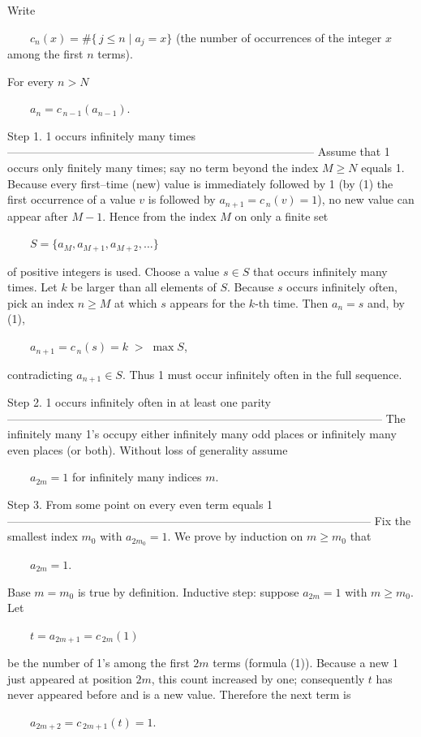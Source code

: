 Write  

  \(\displaystyle c_n(x)=\#\{\,j\le n\mid a_j=x\}\)       (the number of occurrences of the integer \(x\) among the first \(n\) terms).

For every \(n>N\)

  \(\displaystyle a_n=c_{\,n-1}(a_{n-1}).\tag{1}\)

Step 1.  1 occurs infinitely many times  
———————————————————————————  
Assume that 1 occurs only finitely many times; say no term beyond the index \(M\ge N\) equals 1.  
Because every first–time (new) value is immediately followed by 1 (by (1) the
first occurrence of a value \(v\) is followed by \(a_{n+1}=c_{\,n}(v)=1\)),
no new value can appear after \(M-1\).
Hence from the index \(M\) on only a finite set  

  \(S=\{a_M,a_{M+1},a_{M+2},\dots\}\)

of positive integers is used.  
Choose a value \(s\in S\) that occurs infinitely many times.
Let \(k\) be larger than all elements of \(S\).
Because \(s\) occurs infinitely often, pick an index \(n\ge M\) at which
\(s\) appears for the \(k\)-th time.  
Then \(a_{n}=s\) and, by (1),

  \(a_{n+1}=c_{\,n}(s)=k\;>\;\max S\),

contradicting \(a_{n+1}\in S\).
Thus 1 must occur infinitely often in the full sequence.

Step 2. 1 occurs infinitely often in at least one parity  
—————————————————————————————————  
The infinitely many 1’s occupy either infinitely many odd places or
infinitely many even places (or both).  
Without loss of generality assume

  \(a_{2m}=1\) for infinitely many indices \(m\).

Step 3.  From some point on every even term equals 1  
————————————————————————————————  
Fix the smallest index \(m_0\) with \(a_{2m_0}=1\).
We prove by induction on \(m\ge m_0\) that

  \(a_{2m}=1.\)

Base \(m=m_0\) is true by definition.  
Inductive step:
suppose \(a_{2m}=1\) with \(m\ge m_0\).
Let  

  \(t=a_{2m+1}=c_{\,2m}(1)\)

be the number of 1’s among the first \(2m\) terms (formula (1)).
Because a new 1 just appeared at position \(2m\), this count increased by
one; consequently \(t\) has never appeared before and is a
new value.
Therefore the next term is

  \(a_{2m+2}=c_{\,2m+1}(t)=1.\)

